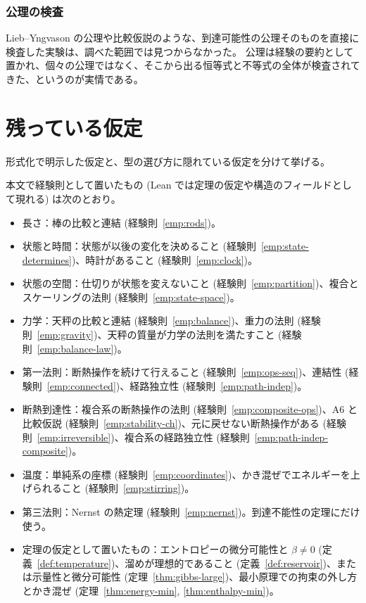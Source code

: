 \subsection{公理の検査}

Lieb--Yngvason の公理や比較仮説のような、到達可能性の公理そのものを直接に検査した実験は、調べた範囲では見つからなかった。
公理は経験の要約として置かれ、個々の公理ではなく、そこから出る恒等式と不等式の全体が検査されてきた、というのが実情である。

\chapter{残っている仮定}
\label{chap:assumptions}

形式化で明示した仮定と、型の選び方に隠れている仮定を分けて挙げる。

本文で経験則として置いたもの (Lean では定理の仮定や構造のフィールドとして現れる) は次のとおり。
\begin{itemize}
  \item 長さ：棒の比較と連結 (経験則~\ref{emp:rods})。
  \item 状態と時間：状態が以後の変化を決めること (経験則~\ref{emp:state-determines})、時計があること (経験則~\ref{emp:clock})。
  \item 状態の空間：仕切りが状態を変えないこと (経験則~\ref{emp:partition})、複合とスケーリングの法則 (経験則~\ref{emp:state-space})。
  \item 力学：天秤の比較と連結 (経験則~\ref{emp:balance})、重力の法則 (経験則~\ref{emp:gravity})、天秤の質量が力学の法則を満たすこと (経験則~\ref{emp:balance-law})。
  \item 第一法則：断熱操作を続けて行えること (経験則~\ref{emp:ops-seq})、連結性 (経験則~\ref{emp:connected})、経路独立性 (経験則~\ref{emp:path-indep})。
  \item 断熱到達性：複合系の断熱操作の法則 (経験則~\ref{emp:composite-ops})、A6 と比較仮説 (経験則~\ref{emp:stability-ch})、元に戻せない断熱操作がある (経験則~\ref{emp:irreversible})、複合系の経路独立性 (経験則~\ref{emp:path-indep-composite})。
  \item 温度：単純系の座標 (経験則~\ref{emp:coordinates})、かき混ぜでエネルギーを上げられること (経験則~\ref{emp:stirring})。
  \item 第三法則：Nernst の熱定理 (経験則~\ref{emp:nernst})。到達不能性の定理にだけ使う。
  \item 定理の仮定として置いたもの：エントロピーの微分可能性と $\beta \ne 0$ (定義~\ref{def:temperature})、溜めが理想的であること (定義~\ref{def:reservoir})、または示量性と微分可能性 (定理~\ref{thm:gibbs-large})、最小原理での拘束の外し方とかき混ぜ (定理~\ref{thm:energy-min}, \ref{thm:enthalpy-min})。
\end{itemize}

